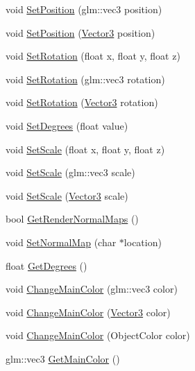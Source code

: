\begin{DoxyCompactItemize}
void \mbox{\hyperlink{class_game_object_acf65efb986ff560387196e334364b3b9}{Set\+Position}} (glm\+::vec3 position)
\item 
void \mbox{\hyperlink{class_game_object_a3a4fb313c8d1694e653a158434d69cf0}{Set\+Position}} (\mbox{\hyperlink{struct_vector3}{Vector3}} position)
\item 
void \mbox{\hyperlink{class_game_object_a166d8094d34a45eb64c0fa0dd1d39fb4}{Set\+Rotation}} (float x, float y, float z)
\item 
void \mbox{\hyperlink{class_game_object_a2facaa6e976a8ac7c731867d3ad03aae}{Set\+Rotation}} (glm\+::vec3 rotation)
\item 
void \mbox{\hyperlink{class_game_object_a4f78a342f36f46e5113ae842bf626a6f}{Set\+Rotation}} (\mbox{\hyperlink{struct_vector3}{Vector3}} rotation)
\item 
void \mbox{\hyperlink{class_game_object_a69b3551055c2a445ef736f332f798ecb}{Set\+Degrees}} (float value)
\item 
void \mbox{\hyperlink{class_game_object_a28891c1985f80927b4b0633de8c67eac}{Set\+Scale}} (float x, float y, float z)
\item 
void \mbox{\hyperlink{class_game_object_af0ae16ce70cc8a28f228bfa507056014}{Set\+Scale}} (glm\+::vec3 scale)
\item 
void \mbox{\hyperlink{class_game_object_ace1f06c6e0e9c8b1f0d3846f12461cc1}{Set\+Scale}} (\mbox{\hyperlink{struct_vector3}{Vector3}} scale)
\item 
bool \mbox{\hyperlink{class_game_object_a1da6cee9bfe225ab39e58b2227faba6a}{Get\+Render\+Normal\+Maps}} ()
\item 
void \mbox{\hyperlink{class_game_object_aaf56a5e3eb48be96bb1ee4796429d28e}{Set\+Normal\+Map}} (char $\ast$location)
\item 
float \mbox{\hyperlink{class_game_object_a5c21a0d0cbc3a071b76aeefe814aa589}{Get\+Degrees}} ()
\item 
void \mbox{\hyperlink{class_game_object_afafffefaf209ad57a5d6ce551d7cb31b}{Change\+Main\+Color}} (glm\+::vec3 color)
\item 
void \mbox{\hyperlink{class_game_object_a937d0876d4c7fd514e6069e0b447c976}{Change\+Main\+Color}} (\mbox{\hyperlink{struct_vector3}{Vector3}} color)
\item 
void \mbox{\hyperlink{class_game_object_a82a066a59aa5ffad07589419c07383e0}{Change\+Main\+Color}} (Object\+Color color)
\item 
glm\+::vec3 \mbox{\hyperlink{class_game_object_a9f320ff03b3cbf254511952dc2f3951a}{Get\+Main\+Color}} ()

\end{DoxyCompactItemize}
